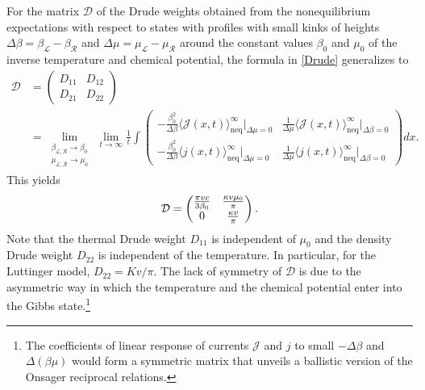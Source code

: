 \documentclass[12pt,a4paper]{article}
\newcommand{\cD}{\mathcal{D}}
\newcommand{\cJ}{\mathcal{J}}
\newcommand{\cL}{\mathcal{L}}
\newcommand{\cR}{\mathcal{R}}
\theoremstyle{definition}
\theoremstyle{remark}
\begin{document}
For the matrix $\cD$ of the Drude weights obtained from the nonequilibrium expectations with respect to states with profiles with small kinks of heights $\Delta\beta=\beta_\cL-\beta_\cR$ and $\Delta\mu=\mu_\cL-\mu_\cR$ around the constant values $\beta_0$ and $\mu_0$ of the inverse temperature and chemical potential, the formula in \eqref{Drude} generalizes to
%
\begin{align}
\cD
& = \left( \begin{matrix}
		D_{11} & D_{12} \\
		D_{21} & D_{22}
	\end{matrix} \right) \nonumber \\
& = \lim_{\substack{\beta_{\cL,\cR}\to\beta_0 \\ \mu_{\cL,\cR}\to\mu_0}} \,
	\lim\limits_{t\to\infty}
        \frac{1}{t} \int
		\left( \begin{matrix}
		-\frac{\beta_0^2}{\Delta\beta} \big\langle \cJ(x,t) 
                \big\rangle^\infty_{\text{neq}}\Big|_{\Delta\mu=0}
		&  \frac{1}{\Delta\mu} \big\langle \cJ(x,t) 
                \big\rangle^\infty_{\text{neq}}\Big|_{\Delta\beta=0} \\
		-\frac{\beta_0^2}{\Delta\beta} 
                \big\langle j(x,t)\big\rangle^\infty_{\text{neq}}\Big|_{\Delta\mu=0}
		&  \frac{1}{\Delta\mu}\big\langle j(x,t) 
                \big\rangle^\infty_{\text{neq}}\Big|_{\Delta\beta=0}
	\end{matrix} \right) dx.
\label{Drudmat}
\end{align}
%
This yields
%
\begin{equation}
\cD
= \left( \begin{matrix}
	\frac{\pi vc}{3\beta_0}	&	\frac{\kappa v\mu_0}{\pi}\cr
	0												&	\frac{\kappa v}{\pi}
\end{matrix} \right) .
\end{equation}
%
Note that the thermal Drude weight $D_{11}$ is independent of $\mu_0$ and the density Drude weight $D_{22}$ is independent of the temperature.
In particular, for the Luttinger model, $D_{22} = {Kv}/{\pi}$.
The lack of symmetry of $\cD$ is due to the asymmetric way in which
the temperature and the chemical potential enter into the Gibbs state.\footnote{The coefficients 
of linear response of currents $\cJ$ and $j$ to small $-\Delta\beta$ and $\Delta(\beta\mu)$ 
would form a symmetric matrix that unveils a ballistic version of the Onsager reciprocal relations.}
\end{document}
